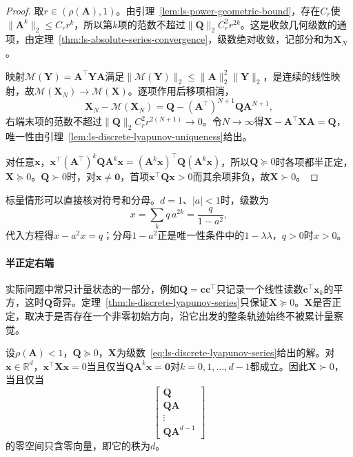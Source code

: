 \begin{proof}
取$r\in(\rho(\bm A),1)$。由引理~\ref{lem:ls-power-geometric-bound}，存在$C_r$使$\lVert\bm A^k\rVert_2\leq C_rr^k$，所以第$k$项的范数不超过$\lVert\bm Q\rVert_2C_r^2r^{2k}$。这是收敛几何级数的通项，由定理~\ref{thm:ls-absolute-series-convergence}，级数绝对收敛，记部分和为$\bm X_N$。

映射$\mathcal M(\bm Y)=\bm A^\top\bm Y\bm A$满足$\lVert\mathcal M(\bm Y)\rVert_2\leq\lVert\bm A\rVert_2^2\lVert\bm Y\rVert_2$，是连续的线性映射，故$\mathcal M(\bm X_N)\to\mathcal M(\bm X)$。逐项作用后移项相消，
\[
 \bm X_N-\mathcal M(\bm X_N)=\bm Q-(\bm A^\top)^{N+1}\bm Q\bm A^{N+1},
\]
右端末项的范数不超过$\lVert\bm Q\rVert_2C_r^2r^{2(N+1)}\to0$。令$N\to\infty$得$\bm X-\bm A^\top\bm X\bm A=\bm Q$，唯一性由引理~\ref{lem:ls-discrete-lyapunov-uniqueness}给出。

对任意$\bm x$，$\bm x^\top(\bm A^\top)^k\bm Q\bm A^k\bm x=(\bm A^k\bm x)^\top\bm Q(\bm A^k\bm x)$，所以$\bm Q\succeq0$时各项都半正定，$\bm X\succeq0$。$\bm Q\succ0$时，对$\bm x\neq\bm0$，首项$\bm x^\top\bm Q\bm x>0$而其余项非负，故$\bm X\succ0$。
\end{proof}

标量情形可以直接核对符号和分母。$d=1$、$|a|<1$时，级数为
\[
 x=\sum_kq\,a^{2k}=\frac q{1-a^2},
\]
代入方程得$x-a^2x=q$；分母$1-a^2$正是唯一性条件中的$1-\lambda\lambda$，$q>0$时$x>0$。

\paragraph{半正定右端}
实际问题中常只计量状态的一部分，例如$\bm Q=\bm c\bm c^\top$只记录一个线性读数$\bm c^\top\bm x_k$的平方，这时$\bm Q$奇异。定理~\ref{thm:ls-discrete-lyapunov-series}只保证$\bm X\succeq0$。$\bm X$是否正定，取决于是否存在一个非零初始方向，沿它出发的整条轨迹始终不被累计量察觉。

\begin{theorem}[半正定右端的正定条件]
\label{thm:ls-discrete-lyapunov-semidefinite}
设$\rho(\bm A)<1$，$\bm Q\succeq0$，$\bm X$为级数~\eqref{eq:ls-discrete-lyapunov-series}给出的解。对$\bm x\in\mathbb R^d$，$\bm x^\top\bm X\bm x=0$当且仅当$\bm Q\bm A^k\bm x=\bm0$对$k=0,1,\ldots,d-1$都成立。因此$\bm X\succ0$，当且仅当
\begin{equation}
 \begin{bmatrix}\bm Q\\\bm Q\bm A\\\vdots\\\bm Q\bm A^{d-1}\end{bmatrix}
 \label{eq:ls-lyapunov-observability-stack}
\end{equation}
的零空间只含零向量，即它的秩为$d$。
\end{theorem}

